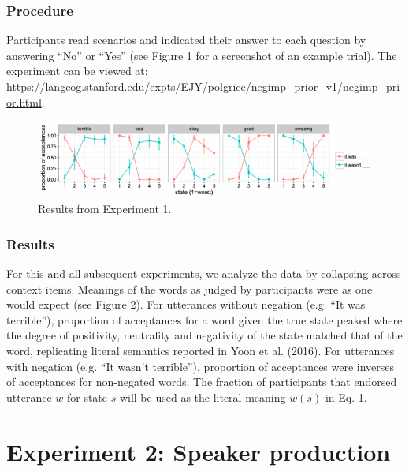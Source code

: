 \documentclass[10pt, letterpaper]{article}
\newenvironment{CodeChunk}{}{}
\begin{document}
\subsubsection{Procedure}\label{procedure}

Participants read scenarios and indicated their answer to each question
by answering ``No'' or ``Yes'' (see Figure 1 for a screenshot of an
example trial). The experiment can be viewed at:
\url{https://langcog.stanford.edu/expts/EJY/polgrice/negimp_prior_v1/negimp_prior.html}.

\begin{CodeChunk}
\captionsetup{width=0.8\textwidth}\begin{figure}[b]

{\centering \includegraphics{figs/expt1_results-1} 

}

\caption[Results from Experiment 1]{Results from Experiment 1.}\label{fig:expt1_results}
\end{figure}
\end{CodeChunk}

\subsubsection{Results}\label{results}

For this and all subsequent experiments, we analyze the data by
collapsing across context items. Meanings of the words as judged by
participants were as one would expect (see Figure 2). For utterances
without negation (e.g. ``It was terrible''), proportion of acceptances
for a word given the true state peaked where the degree of positivity,
neutrality and negativity of the state matched that of the word,
replicating literal semantics reported in Yoon et al. (2016). For
utterances with negation (e.g. ``It wasn't terrible''), proportion of
acceptances were inverses of acceptances for non-negated words. The
fraction of participants that endorsed utterance \(w\) for state \(s\)
will be used as the literal meaning \({w}(s)\) in Eq. 1.

\section{Experiment 2: Speaker
production}\label{experiment-2-speaker-production}
\end{document}
